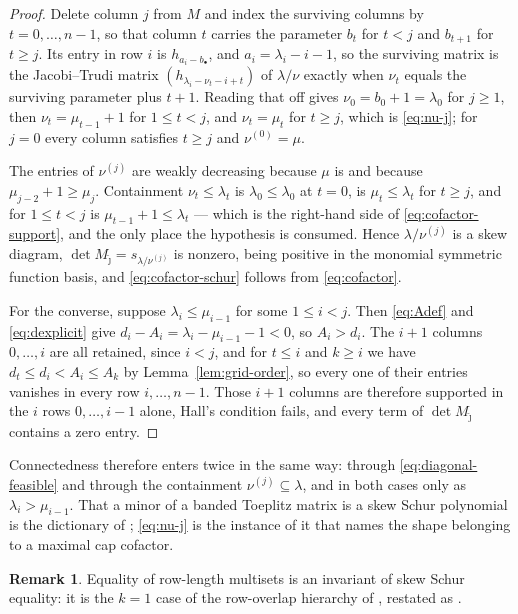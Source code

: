 \documentclass[11pt,a4paper]{amsart}
\numberwithin{equation}{section}
\theoremstyle{plain}
\theoremstyle{definition}
\newtheorem{remark}[theorem]{Remark}
\begin{document}
\begin{proof}
Delete column \(j\) from \(M\) and index the surviving columns by \(t=0,\ldots,n-1\), so that column \(t\) carries the parameter \(b_t\) for \(t<j\) and \(b_{t+1}\) for \(t\ge j\).  Its entry in row \(i\) is \(h_{a_i-b_{\bullet}}\), and \(a_i=\lambda_i-i-1\), so the surviving matrix is the Jacobi--Trudi matrix \((h_{\lambda_i-\nu_t-i+t})\) of \(\lambda/\nu\) exactly when \(\nu_t\) equals the surviving parameter plus \(t+1\).  Reading that off gives \(\nu_0=b_0+1=\lambda_0\) for \(j\ge1\), then \(\nu_t=\mu_{t-1}+1\) for \(1\le t<j\), and \(\nu_t=\mu_t\) for \(t\ge j\), which is \eqref{eq:nu-j}; for \(j=0\) every column satisfies \(t\ge j\) and \(\nu^{(0)}=\mu\).

The entries of \(\nu^{(j)}\) are weakly decreasing because \(\mu\) is and because \(\mu_{j-2}+1\ge\mu_j\).  Containment \(\nu_t\le\lambda_t\) is \(\lambda_0\le\lambda_0\) at \(t=0\), is \(\mu_t\le\lambda_t\) for \(t\ge j\), and for \(1\le t<j\) is \(\mu_{t-1}+1\le\lambda_t\) --- which is the right-hand side of \eqref{eq:cofactor-support}, and the only place the hypothesis is consumed.  Hence \(\lambda/\nu^{(j)}\) is a skew diagram, \(\det M_{\widehat\jmath}=s_{\lambda/\nu^{(j)}}\) is nonzero, being positive in the monomial symmetric function basis, and \eqref{eq:cofactor-schur} follows from \eqref{eq:cofactor}.

For the converse, suppose \(\lambda_i\le\mu_{i-1}\) for some \(1\le i<j\).  Then \eqref{eq:Adef} and \eqref{eq:dexplicit} give \(d_i-A_i=\lambda_i-\mu_{i-1}-1<0\), so \(A_i>d_i\).  The \(i+1\) columns \(0,\ldots,i\) are all retained, since \(i<j\), and for \(t\le i\) and \(k\ge i\) we have \(d_t\le d_i<A_i\le A_k\) by Lemma~\ref{lem:grid-order}, so every one of their entries vanishes in every row \(i,\ldots,n-1\).  Those \(i+1\) columns are therefore supported in the \(i\) rows \(0,\ldots,i-1\) alone, Hall's condition fails, and every term of \(\det M_{\widehat\jmath}\) contains a zero entry.
\end{proof}

Connectedness therefore enters twice in the same way: through \eqref{eq:diagonal-feasible} and through the containment \(\nu^{(j)}\subseteq\lambda\), and in both cases only as \(\lambda_i>\mu_{i-1}\).  That a minor of a banded Toeplitz matrix is a skew Schur polynomial is the dictionary of \cite{Maximenko2017TrenchFormulas}; \eqref{eq:nu-j} is the instance of it that names the shape belonging to a maximal cap cofactor.

\begin{remark}
Equality of row-length multisets is an invariant of skew Schur equality: it is the \(k=1\) case of the row-overlap hierarchy of \cite[Cor.~8.11]{Reiner2007Coincidences}, restated as \cite[Thm.~3.5]{McNamara2014ComparingSkew}.
\end{remark}
\end{document}
